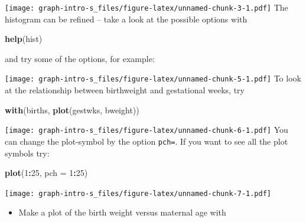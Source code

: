 \documentclass[
]{book}
\newenvironment{Shaded}{\begin{snugshade}}{\end{snugshade}}
\newcommand{\AttributeTok}[1]{\textcolor[rgb]{0.13,0.29,0.53}{#1}}
\newcommand{\DecValTok}[1]{\textcolor[rgb]{0.00,0.00,0.81}{#1}}
\newcommand{\FunctionTok}[1]{\textcolor[rgb]{0.13,0.29,0.53}{\textbf{#1}}}
\newcommand{\NormalTok}[1]{#1}
\newcommand{\SpecialCharTok}[1]{\textcolor[rgb]{0.81,0.36,0.00}{\textbf{#1}}}
\newcommand{\StringTok}[1]{\textcolor[rgb]{0.31,0.60,0.02}{#1}}
\providecommand{\tightlist}{%
  \setlength{\itemsep}{0pt}\setlength{\parskip}{0pt}}
\begin{document}
\texttt{[image: graph-intro-s\_files/figure-latex/unnamed-chunk-3-1.pdf]}
The histogram can be refined -- take a look at the possible options with

\begin{Shaded}
\begin{Highlighting}[]
\FunctionTok{help}\NormalTok{(hist)}
\end{Highlighting}
\end{Shaded}

and try some of the options, for example:

\begin{Shaded}
\end{Shaded}

\texttt{[image: graph-intro-s\_files/figure-latex/unnamed-chunk-5-1.pdf]}
To look at the relationship between birthweight and gestational weeks, try

\begin{Shaded}
\begin{Highlighting}[]
\FunctionTok{with}\NormalTok{(births, }\FunctionTok{plot}\NormalTok{(gestwks, bweight))}
\end{Highlighting}
\end{Shaded}

\texttt{[image: graph-intro-s\_files/figure-latex/unnamed-chunk-6-1.pdf]}
You can change the plot-symbol by the option \texttt{pch=}. If you
want to see all the plot symbols try:

\begin{Shaded}
\begin{Highlighting}[]
\FunctionTok{plot}\NormalTok{(}\DecValTok{1}\SpecialCharTok{:}\DecValTok{25}\NormalTok{, }\AttributeTok{pch =} \DecValTok{1}\SpecialCharTok{:}\DecValTok{25}\NormalTok{)}
\end{Highlighting}
\end{Shaded}

\texttt{[image: graph-intro-s\_files/figure-latex/unnamed-chunk-7-1.pdf]}

\begin{itemize}
\tightlist
\item
  Make a plot of the birth weight versus maternal age with
\end{itemize}
\end{document}
